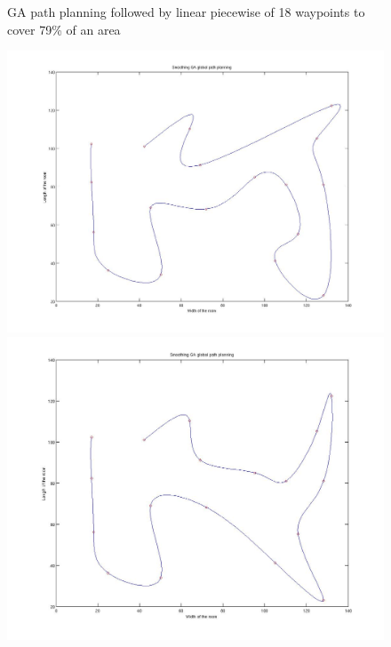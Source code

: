 \begin{figure}[h]
  \endminipage
  \caption{GA path planning followed by linear piecewise of 18 waypoints to cover 79\% of an area}
  \label{fig:Path_planning_linear_18}
\end{figure}

\begin{figure}[h]
  \includegraphics[width=\linewidth]{figures/18pts_GA_linear_2D_1_smooth.jpg}  
  \endminipage \hfill
  \includegraphics[width=\linewidth]{figures/18pts_GA_linear_2D_2_smooth.jpg}  
  \endminipage \hfill

\end{figure}
